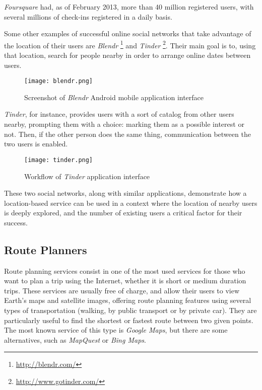 \emph{Foursquare} had, as of February 2013, more than 40 million registered users, with several millions of check-ins registered in a daily basis.

Some other examples of successful online social networks that take advantage of the location of their users are \emph{Blendr} \footnote{\url{http://blendr.com/}} and \emph{Tinder} \footnote{\url{http://www.gotinder.com/}}. Their main goal is to, using that location, search for people nearby in order to arrange online dates between users.

\begin{figure}[h!]
  \begin{center}
    \leavevmode
    \texttt{[image: blendr.png]}
    \caption{Screenshot of \emph{Blendr} Android mobile application interface}
    \label{fig:blndr}
  \end{center}
\end{figure}

\emph{Tinder}, for instance, provides users with a sort of catalog from other users nearby, prompting them with a choice: marking them as a possible interest or not. Then, if the other person does the same thing, communication between the two users is enabled. 

\begin{figure}[h!]
  \begin{center}
    \leavevmode
    \texttt{[image: tinder.png]}
    \caption{Workflow of \emph{Tinder} application interface}
    \label{fig:tindr}
  \end{center}
\end{figure}

These two social networks, along with similar applications, demonstrate how a location-based service can be used in a context where the location of nearby users is deeply explored, and the number of existing users a critical factor for their success.

\pagebreak

\subsection{Route Planners}

Route planning services consist in one of the most used services for those who want to plan a trip using the Internet, whether it is short or medium duration trips. 
These services are usually free of charge, and allow their users to view Earth's maps and satellite images, offering route planning features using several types of transportation (walking, by public transport or by private car). They are particularly useful to find the shortest or fastest route between two given points. 
The most known service of this type is \emph{Google Maps}, but there are some alternatives, such as \emph{MapQuest} or \emph{Bing Maps}.

